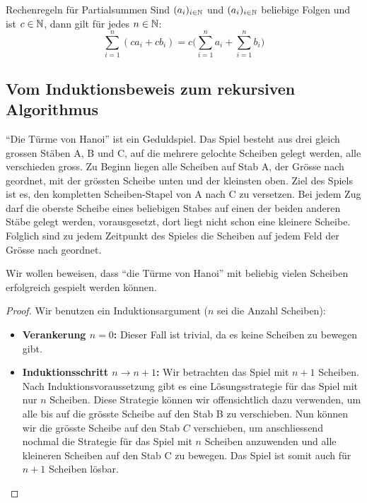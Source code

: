 \begin{lemma}{Rechenregeln für Partialsummen}
    Sind $(a_i)_{i\in\mathbb{N}}$ und $(a_i)_{i\in\mathbb{N}}$ beliebige Folgen und ist $c\in\mathbb{N}$, dann gilt für jedes $n\in\mathbb{N}$:
    \[
        \sum_{i=1}^n(ca_i+cb_i)=c\big(\sum_{i=1}^na_i+\sum_{i=1}^nb_i\big)
    \]
\end{lemma}

\subsection{Vom Induktionsbeweis zum rekursiven Algorithmus}

\begin{example}
    ``Die Türme von Hanoi'' ist ein Geduldspiel. Das Spiel besteht aus drei gleich grossen Stäben A, B und C, auf die mehrere gelochte Scheiben gelegt werden, alle verschieden gross. Zu Beginn liegen alle Scheiben auf Stab A, der Grösse nach geordnet, mit der grössten Scheibe unten und der kleinsten oben. Ziel des Spiels ist es, den kompletten Scheiben-Stapel von A nach C zu versetzen.
    Bei jedem Zug darf die oberste Scheibe eines beliebigen Stabes auf einen der beiden anderen Stäbe gelegt werden, vorausgesetzt, dort liegt nicht schon eine kleinere Scheibe. Folglich sind zu jedem Zeitpunkt des Spieles die Scheiben auf jedem Feld der Grösse nach geordnet.

    Wir wollen beweisen, dass ``die Türme von Hanoi'' mit beliebig vielen Scheiben erfolgreich gespielt werden können.
    \begin{proof} Wir benutzen ein Induktionsargument ($n$ sei die Anzahl Scheiben):
        \begin{itemize}
            \item \textbf{Verankerung $n=0$:} Dieser Fall ist trivial, da es keine Scheiben zu bewegen gibt.
            \item \textbf{Induktionsschritt $n\to n+1$:} Wir betrachten das Spiel mit $n+1$ Scheiben. Nach Induktionsvoraussetzung gibt es eine Lösungsstrategie für das Spiel mit nur $n$ Scheiben. Diese Strategie können wir offensichtlich dazu verwenden, um alle bis auf die grösste Scheibe auf den Stab B zu verschieben. Nun können wir die grösste Scheibe auf den Stab $C$ verschieben, um anschliessend nochmal die Strategie für das Spiel mit $n$ Scheiben anzuwenden und alle kleineren Scheiben auf den Stab C zu bewegen. Das Spiel ist somit auch für $n+1$ Scheiben lösbar. \qedhere
        \end{itemize}
    \end{proof}
\end{example}

